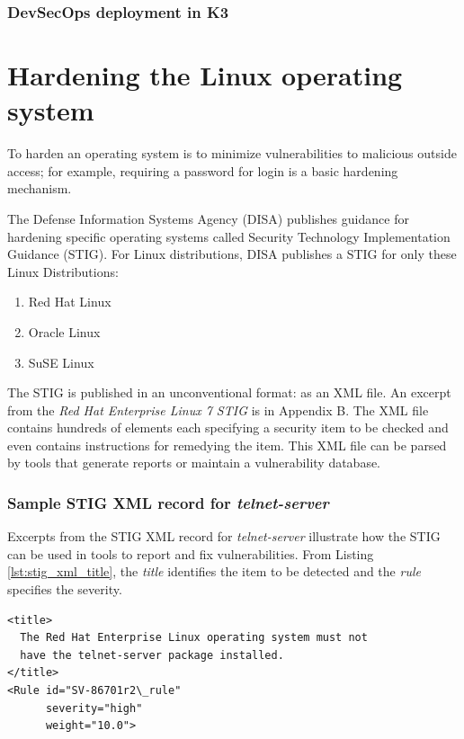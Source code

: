 \documentclass[12pt]{article}
\begin{document}
\subsubsection{DevSecOps deployment in K3}



%
\newpage
\section{Hardening the Linux operating system}
\label{sec:image_hardening}

To harden an operating system is to minimize vulnerabilities to malicious
outside access; for example, requiring a password for login is a basic hardening
mechanism.

The Defense Information Systems Agency (DISA) publishes guidance for hardening
specific operating systems called Security Technology Implementation Guidance
(STIG).  For Linux distributions, DISA publishes a STIG for only these Linux
Distributions:
\begin{enumerate}
    \item Red Hat Linux
    \item Oracle Linux
    \item SuSE Linux
\end{enumerate}

The STIG is published in an unconventional format: as an XML file.  An excerpt
from the \emph{Red Hat Enterprise Linux 7 STIG} is in Appendix B.  The XML file
contains hundreds of elements each specifying a security item to be checked
and even contains instructions for remedying the item.  This XML file can be
parsed by tools that generate reports or maintain a vulnerability database.

\subsubsection{Sample STIG XML record for \emph{telnet-server}}

Excerpts from the STIG XML record for \emph{telnet-server} illustrate how the
STIG can be used in tools to report and fix vulnerabilities.  From Listing
\ref{lst:stig_xml_title}, the \emph{title} identifies the item to be detected and
the \emph{rule} specifies the severity.

\lstset{
    language=xml,
    basicstyle=\footnotesize\ttfamily,
    linewidth=5.0in,
    frame=single,
    showstringspaces=false
}
\begin{adjustwidth}{0.5in}{0.0in}
\begin{lstlisting}[caption={STIG record \emph{title} and \emph{rule}},
label={lst:stig_xml_title}]
<title>
  The Red Hat Enterprise Linux operating system must not
  have the telnet-server package installed.
</title>
<Rule id="SV-86701r2\_rule"
      severity="high"
      weight="10.0">
\end{lstlisting}
\end{adjustwidth}
\vspace{0.8cm}
\end{document}
